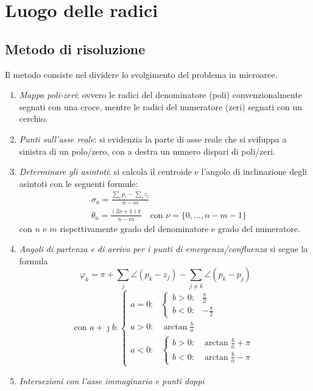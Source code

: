\chapter{Luogo delle radici}
\section{Metodo di risoluzione}
Il metodo consiste nel dividere lo svolgimento del problema in microaree.
\begin{enumerate}
	\item \emph{Mappa poli-zeri}: ovvero le radici del denominatore (poli)
		convenzionalmente segnati con una croce, mentre le radici del
		numeratore (zeri) segnati con un cerchio.
	\item \emph{Punti sull'asse reale}: si evidenzia la parte di asse reale
		che si sviluppa a sinistra di un polo/zero, con a destra un numero
		dispari di poli/zeri.
	\item \emph{Determinare gli asintoti}: si calcola il centroide e l'angolo
		di inclinazione degli asintoti con le seguenti formule:
		\begin{align*}
			& \sigma_a = \frac{\sum_{i} p_i - \sum_{i} z_i}{n-m} \\
			& \theta_a = \frac{(2\nu+1)\pi}{n-m} \quad \text{con } \nu = \bigl\{ 0,\dots,n-m-1 \bigr\}
		\end{align*}
		con \(n\) e \(m\) rispettivamente grado del denominatore e grado del numeratore.
	\item \emph{Angoli di partenza e di arrivo per i punti di emergenza/confluenza}
		si segue la formula
		\[
			\varphi_k = \pi +\sum_j \angle(p_k-z_j) -\sum_{j \neq k} \angle(p_k-p_j)
		\]
		\[
			\text{con } a+\jmath b \colon
			\begin{cases}
				a = 0 \colon &
					\begin{cases}
						b > 0\colon & \frac{\pi}{2} \\
						b < 0\colon & -\frac{\pi}{2}
					\end{cases} \\
				a > 0 \colon & \arctan{\frac{b}{a}} \\
				a < 0 \colon &
					\begin{cases}
						b > 0\colon & \arctan{\frac{b}{a}} +\pi \\
						b < 0\colon & \arctan{\frac{b}{a}} -\pi
					\end{cases}
			\end{cases}
		\]
	\item \emph{Intersezioni con l'asse immaginario e punti doppi}

\end{enumerate}
